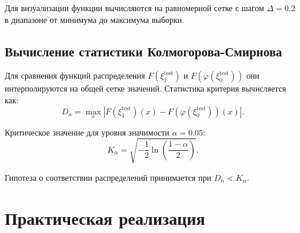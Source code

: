 \documentclass[a4paper, 14pt]{extarticle}
\begin{document}
Для визуализации функции вычисляются на равномерной сетке с шагом $\Delta = 0.2$ в диапазоне от минимума до максимума выборки.

\subsection{Вычисление статистики Колмогорова-Смирнова}

Для сравнения функций распределения $F(\xi_1^{\text{test}})$ и $F(\varphi(\xi_0^{\text{test}}))$ они интерполируются на общей сетке значений. Статистика критерия вычисляется как:
\[
D_n = \max_x |F(\xi_1^{\text{test}})(x) - F(\varphi(\xi_0^{\text{test}}))(x)|.
\]

Критическое значение для уровня значимости $\alpha = 0.05$:
\[
K_{\alpha} = \sqrt{-\frac{1}{2} \ln\left(\frac{1-\alpha}{2}\right)}.
\]

Гипотеза о соответствии распределений принимается при $D_n < K_{\alpha}$.

\section{Практическая реализация}
\end{document}
